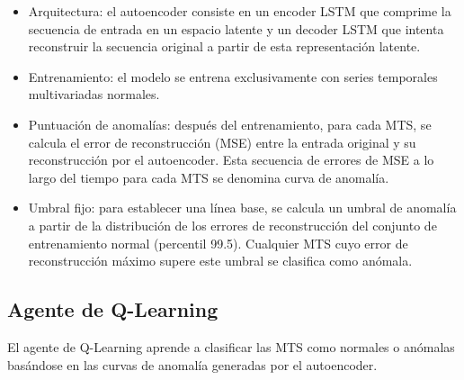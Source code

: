 \documentclass[12pt]{article}
\begin{document}
\begin{itemize}
    \item Arquitectura: el autoencoder consiste en un encoder LSTM que comprime la secuencia de entrada en un espacio latente y un decoder LSTM que intenta reconstruir la secuencia original a partir de esta representación latente.
    \item Entrenamiento: el modelo se entrena exclusivamente con series temporales multivariadas normales.
    \item Puntuación de anomalías: después del entrenamiento, para cada MTS, se calcula el error de reconstrucción (MSE) entre la entrada original y su reconstrucción por el autoencoder. Esta secuencia de errores de MSE a lo largo del tiempo para cada MTS se denomina curva de anomalía.
    \item Umbral fijo: para establecer una línea base, se calcula un umbral de anomalía a partir de la distribución de los errores de reconstrucción del conjunto de entrenamiento normal (percentil 99.5). Cualquier MTS cuyo error de reconstrucción máximo supere este umbral se clasifica como anómala.
\end{itemize}

\subsection{Agente de Q-Learning}
El agente de Q-Learning aprende a clasificar las MTS como normales o anómalas basándose en las curvas de anomalía generadas por el autoencoder.
\end{document}
